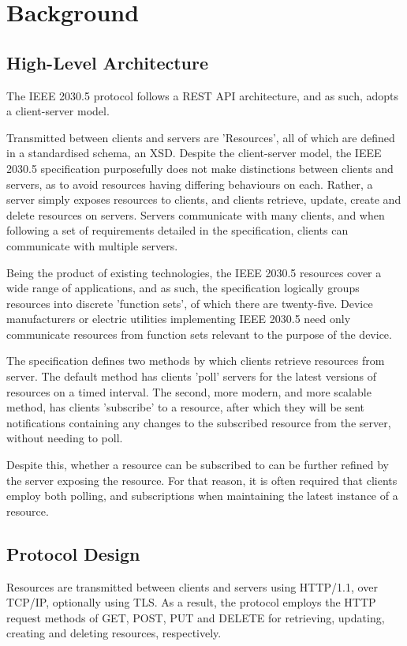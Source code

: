 \chapter{Background}\label{ch:background}

\section{High-Level Architecture}
The IEEE 2030.5 protocol follows a REST API architecture, and as such, adopts a client-server model.

Transmitted between clients and servers are 'Resources', all of which are defined in a standardised schema, an XSD. 
Despite the client-server model, the IEEE 2030.5 specification purposefully does not make distinctions between clients and servers, as to avoid resources having differing behaviours on each. Rather, a server simply exposes resources to clients, and clients retrieve, update, create and delete resources on servers.
Servers communicate with many clients, and when following a set of requirements detailed in the specification, clients can communicate with multiple servers.

Being the product of existing technologies, the IEEE 2030.5 resources cover a wide range of applications, and as such, the specification logically groups resources into discrete 'function sets', of which there are twenty-five. 
Device manufacturers or electric utilities implementing IEEE 2030.5 need only communicate resources from function sets relevant to the purpose of the device. 

The specification defines two methods by which clients retrieve resources from server. The default method has clients 'poll' servers for the latest versions of resources on a timed interval.
The second, more modern, and more scalable method, has clients 'subscribe' to a resource, after which they will be sent notifications containing any changes to the subscribed resource from the server, without needing to poll.

Despite this, whether a resource can be subscribed to can be further refined by the server exposing the resource. For that reason, it is often required that clients employ both polling, and subscriptions when maintaining the latest instance of a resource. \cite{AUSDOE} 
\cite{IEEE2030.5}

\section{Protocol Design}
Resources are transmitted between clients and servers using HTTP/1.1, over TCP/IP, optionally using TLS.
As a result, the protocol employs the HTTP request methods of GET, POST, PUT and DELETE for retrieving, updating, creating and deleting resources, respectively.

